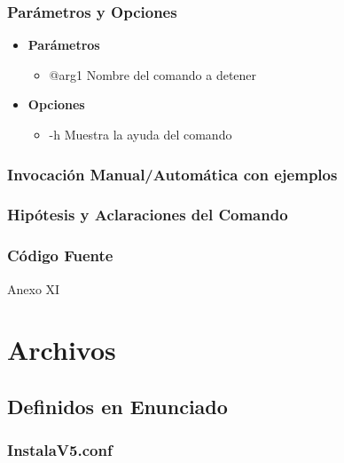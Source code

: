 \documentclass[a4paper,10pt,titlepage]{article}
\begin{document}
		\subsubsection{Par\'ametros y Opciones}
			\begin {itemize}
				\item \textbf{Par\'ametros} {
					\begin{itemize}
						\item {@arg1 }{Nombre del comando a detener}
					\end{itemize}
				}
				\item \textbf{Opciones}{
					\begin{itemize}
						\item {-h }{Muestra la ayuda del comando} 
					\end{itemize}
				}

			\end{itemize}
	
		\subsubsection{Invocaci\'on Manual/Autom\'atica con ejemplos}

		\subsubsection{Hip\'otesis y Aclaraciones del Comando}

		\subsubsection{C\'odigo Fuente}
			Anexo XI

\section{Archivos}

	\subsection{Definidos en Enunciado}
		
		\subsubsection{InstalaV5.conf}
\end{document}
